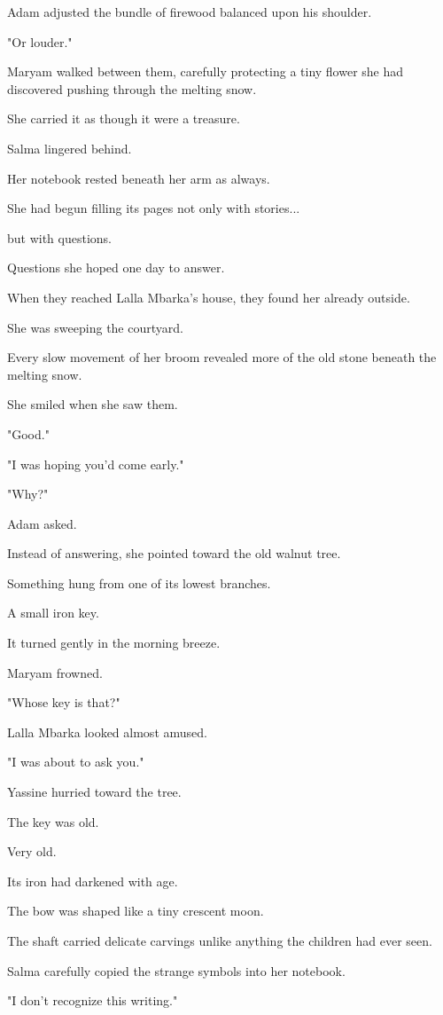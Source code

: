 \documentclass[12pt,openany]{book}
\begin{document}
Adam adjusted the bundle of firewood balanced upon his shoulder.

"Or louder."

Maryam walked between them, carefully protecting a tiny flower she had discovered pushing through the melting snow.

She carried it as though it were a treasure.

Salma lingered behind.

Her notebook rested beneath her arm as always.

She had begun filling its pages not only with stories...

but with questions.

Questions she hoped one day to answer.

When they reached Lalla Mbarka's house, they found her already outside.

She was sweeping the courtyard.

Every slow movement of her broom revealed more of the old stone beneath the melting snow.

She smiled when she saw them.

"Good."

"I was hoping you'd come early."

"Why?"

Adam asked.

Instead of answering, she pointed toward the old walnut tree.

Something hung from one of its lowest branches.

A small iron key.

It turned gently in the morning breeze.

Maryam frowned.

"Whose key is that?"

Lalla Mbarka looked almost amused.

"I was about to ask you."

Yassine hurried toward the tree.

The key was old.

Very old.

Its iron had darkened with age.

The bow was shaped like a tiny crescent moon.

The shaft carried delicate carvings unlike anything the children had ever seen.

Salma carefully copied the strange symbols into her notebook.

"I don't recognize this writing."
\end{document}
